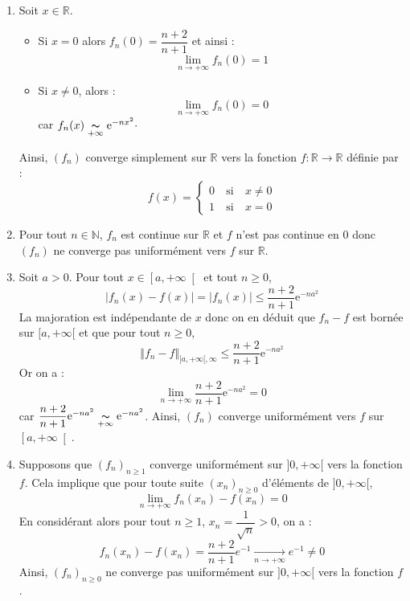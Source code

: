 \documentclass[a4paper,10pt]{report}
\begin{document}
\corr \begin{enumerate}
\item Soit $x\in\mathbb{R}$.
\begin{itemize}
\item Si $x=0$ alors $f_n(0)=\dfrac{n+2}{n+1}$ et ainsi :
$$\lim\limits_{n\to+\infty}^{}f_n(0)=1$$
\item Si $x\neq 0$, alors :
$$\lim\limits_{n\to+\infty}^{}f_n(0)=0$$ 
car $f_n(x)\underset{+\infty}{\thicksim}\mathrm{e}^{-nx^2} \cdot$
\end{itemize}
Ainsi, $(f_n)$ converge simplement sur $\mathbb{R}$ vers la fonction $f : \mathbb{R} \rightarrow \mathbb{R}$ définie par :
 $$f(x)=\left\lbrace \begin{array}{lll}
 0&\:\text{si}\:& x\neq 0\\
 1&\:\text{si}\:& x=0
 \end{array}\right.  $$
\item Pour tout $n \in \mathbb{N}$, $f_n$ est continue sur $\mathbb{R}$ et $f$ n'est pas continue en $0$ donc $(f_n)$ ne converge pas uniformément vers $f$ sur $\mathbb{R}$.
\item  Soit $a>0$. Pour tout $x\in \left[a,+\infty \right[$ et tout $n \geq 0$,
$$|f_n(x)-f(x)|=|f_n(x)|\leq \dfrac{n+2}{n+1}\mathrm{e}^{-n a^{2}}$$
La majoration est indépendante de $x$ donc on en déduit que $f_n-f$ est bornée sur $[a, + \infty[$ et que pour tout $n \geq 0$, 
$$ \Vert f_n - f \Vert_{[a, + \infty[,\infty} \leq \dfrac{n+2}{n+1}\mathrm{e}^{-n a^{2}}$$
Or on a :
$$\lim\limits_{n\to +\infty}^{}\dfrac{n+2}{n+1}\mathrm{e}^{-n a^{2}}=0$$
car $\dfrac{n+2}{n+1}\mathrm{e}^{-n a^{2}}\underset{+\infty}{\thicksim}\mathrm{e}^{-n a^{2}}$. Ainsi, $(f_n)$ converge uniformément vers $f$ sur $\left[a,+\infty \right[$.
\item Supposons que $\left(f_{n}\right) _{n \geq 1}$ converge uniform\'{e}ment sur $]0,+\infty[$ vers la fonction $f$. Cela implique que pour toute suite $(x_n)_{n \geq 0}$ d'éléments de $]0, + \infty[$,
$$ \lim_{n \rightarrow + \infty} f_n(x_n) - f(x_n) = 0$$
En considérant alors pour tout $n \geq 1$, $x_n = \dfrac{1}{\sqrt{n}}>0$, on a :
$$ f_n(x_n)-f(x_n) = \dfrac{n+2}{n+1} e^{-1} \underset{n \rightarrow + \infty}{\rightarrow} e^{-1} \neq 0$$
Ainsi, $\left(f_{n}\right) _{n \geq 0}$ ne converge pas uniform\'{e}ment sur $]0,+\infty[$ vers la fonction $f$.
\end{enumerate}

\medskip
\end{document}
